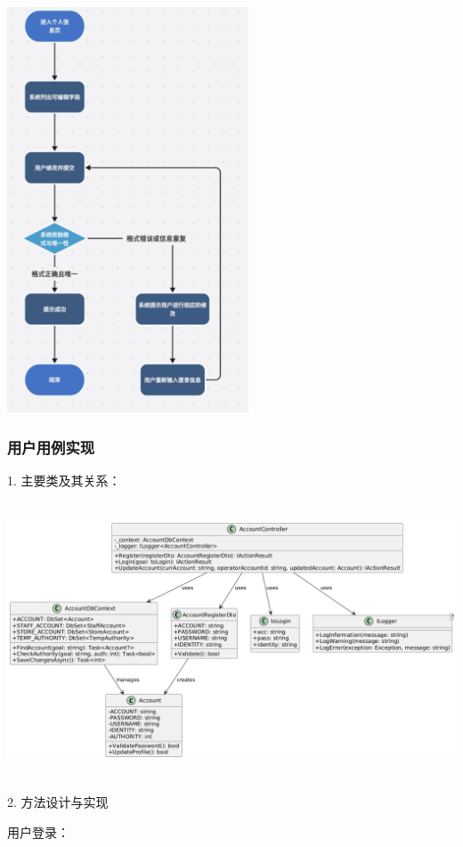\documentclass[]{article}
\begin{document}
\includegraphics[width=2.82083in,height=4.73958in]{media/media/image3.png}

\hypertarget{ux7528ux6237ux7528ux4f8bux5b9eux73b0}{%
\subsubsection{用户用例实现}\label{ux7528ux6237ux7528ux4f8bux5b9eux73b0}}

1. 主要类及其关系：

\includegraphics[width=6.06528in,height=3.22222in]{media/media/image4.png}

2. 方法设计与实现

用户登录：
\end{document}
